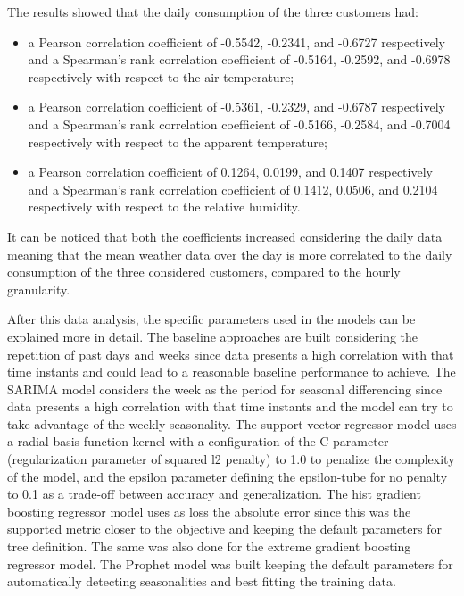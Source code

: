 The results showed that the daily consumption of the three customers had:
\begin{itemize}
  \item a Pearson correlation coefficient of -0.5542, -0.2341, and -0.6727 respectively and a Spearman's rank correlation coefficient of -0.5164, -0.2592, and -0.6978 respectively with respect to the air temperature;
  \item a Pearson correlation coefficient of -0.5361, -0.2329, and -0.6787 respectively and a Spearman's rank correlation coefficient of -0.5166, -0.2584, and -0.7004 respectively with respect to the apparent temperature;
  \item a Pearson correlation coefficient of 0.1264, 0.0199, and 0.1407 respectively and a Spearman's rank correlation coefficient of 0.1412, 0.0506, and 0.2104 respectively with respect to the relative humidity.
\end{itemize}
It can be noticed that both the coefficients increased considering the daily data meaning that the mean weather data over the day is more correlated to the daily consumption of the three considered customers, compared to the hourly granularity.


After this data analysis, the specific parameters used in the models can be explained more in detail.
The baseline approaches are built considering the repetition of past days and weeks since data presents a high correlation with that time instants and could lead to a reasonable baseline performance to achieve.
The SARIMA model considers the week as the period for seasonal differencing since data presents a high correlation with that time instants and the model can try to take advantage of the weekly seasonality.
The support vector regressor model uses a radial basis function kernel with a configuration of the C parameter (regularization parameter of squared l2 penalty) to 1.0 to penalize the complexity of the model, and the epsilon parameter defining the epsilon-tube for no penalty to 0.1 as a trade-off between accuracy and generalization.
The hist gradient boosting regressor model uses as loss the absolute error since this was the supported metric closer to the objective and keeping the default parameters for tree definition.
The same was also done for the extreme gradient boosting regressor model.
The Prophet model was built keeping the default parameters for automatically detecting seasonalities and best fitting the training data.

